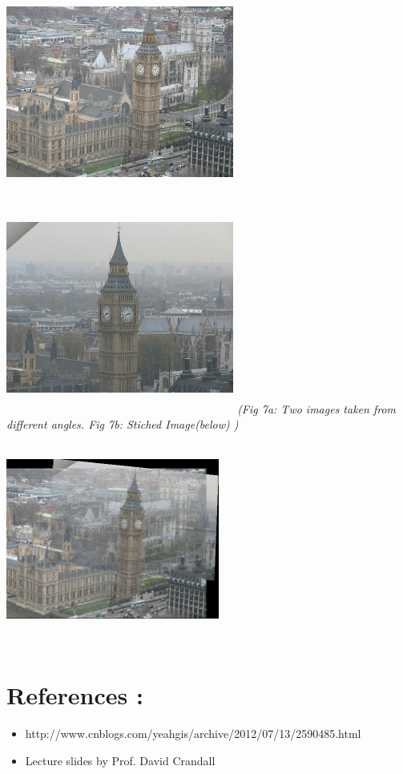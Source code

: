 \documentclass{article}
\begin{document}
\begin{enumerate}
\begin{center}
					\includegraphics[height=7cm,width=7.5cm]{444a} \includegraphics[height=7cm,width=7.5cm]{444b} 
					\textit{	(Fig 7a: Two images taken from different angles. Fig 7b: Stiched Image(below) )} \\
					\includegraphics[height=7cm,width=7cm]{444c}  \\
				\end{center}
					
			\end{enumerate}
			
			\section{References :}
			\begin{itemize}
				\item http://www.cnblogs.com/yeahgis/archive/2012/07/13/2590485.html 
				\item Lecture slides by Prof. David Crandall
			\end{itemize}
		
\end{document}
